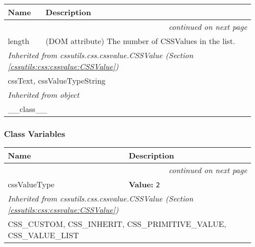     \vspace{-1cm}
\hspace{\varindent}\begin{longtable}{|p{\varnamewidth}|p{\vardescrwidth}|l}
\cline{1-2}
\cline{1-2} \centering \textbf{Name} & \centering \textbf{Description}& \\
\cline{1-2}
\endhead\cline{1-2}\multicolumn{3}{r}{\small\textit{continued on next page}}\\\endfoot\cline{1-2}
\endlastfoot\raggedright l\-e\-n\-g\-t\-h\- & \raggedright (DOM attribute) The number of CSSValues in the list.&\\
\cline{1-2}
\multicolumn{2}{|l|}{\textit{Inherited from cssutils.css.cssvalue.CSSValue \textit{(Section \ref{cssutils:css:cssvalue:CSSValue})}}}\\
\multicolumn{2}{|p{\varwidth}|}{\raggedright cssText, cssValueTypeString}\\
\cline{1-2}
\multicolumn{2}{|l|}{\textit{Inherited from object}}\\
\multicolumn{2}{|p{\varwidth}|}{\raggedright \_\_class\_\_}\\
\cline{1-2}
\end{longtable}



  \subsubsection{Class Variables}

    \vspace{-1cm}
\hspace{\varindent}\begin{longtable}{|p{\varnamewidth}|p{\vardescrwidth}|l}
\cline{1-2}
\cline{1-2} \centering \textbf{Name} & \centering \textbf{Description}& \\
\cline{1-2}
\endhead\cline{1-2}\multicolumn{3}{r}{\small\textit{continued on next page}}\\\endfoot\cline{1-2}
\endlastfoot\raggedright c\-s\-s\-V\-a\-l\-u\-e\-T\-y\-p\-e\- & \raggedright \textbf{Value:} 
{\tt 2}&\\
\cline{1-2}
\multicolumn{2}{|l|}{\textit{Inherited from cssutils.css.cssvalue.CSSValue \textit{(Section \ref{cssutils:css:cssvalue:CSSValue})}}}\\
\multicolumn{2}{|p{\varwidth}|}{\raggedright CSS\_CUSTOM, CSS\_INHERIT, CSS\_PRIMITIVE\_VALUE, CSS\_VALUE\_LIST}\\
\cline{1-2}
\end{longtable}

